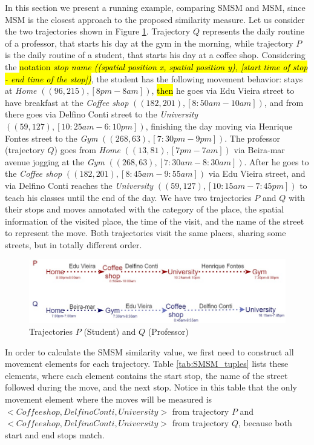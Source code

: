 \documentclass[12pt]{article}
\begin{document}
In this section we present a running example, comparing SMSM and MSM, since MSM is the closest approach to the proposed similarity measure.
Let us consider the two trajectories shown in Figure \ref{fig:bus}. Trajectory $Q$ represents the daily routine of a professor, that starts his day at the gym in the morning, while trajectory $P$ is the daily routine of a student, that starts his day at a coffee shop. Considering the \hl{notation \textit{stop name ((spatial position x, spatial position y), [start time of stop - end time of the stop])}}, the student has the following movement behavior: stays at \textit{Home} $((96,215), [8pm-8am])$, \hl{then} he goes via Edu Vieira street to have breakfast at the \textit{Coffee shop} $((182,201), [8:50am-10am])$, and from there goes via Delfino Conti street to the \textit{University} $((59,127), [10:25am-6:10pm])$, finishing the day moving via Henrique Fontes street to the \textit{Gym} $((268,63), [7:30pm-9pm])$. The professor (trajectory $Q$) goes from \textit{Home} $((13,81), [7pm-7am])$ via Beira-mar avenue jogging at the \textit{Gym} $((268,63), [7:30am-8:30am])$. After he goes to the \textit{Coffee shop} $((182,201), [8:45am-9:55am])$ via Edu Vieira street, and via Delfino Conti reaches the \textit{University} $((59,127), [10:15am-7:45pm])$ to teach his classes until the end of the day. We have two trajectories $P$ and $Q$ with their stops and moves annotated with the category of the place, the spatial information of the visited place, the time of the visit, and the name of the street to represent the move. Both trajectories visit the same places, sharing some streets, but in totally different order.
\begin{figure}[h!]
\centering
\includegraphics[width=1\textwidth]{Images/running_example.jpg}
\caption{\label{fig:bus} Trajectories $P$ (Student) and $Q$ (Professor)}
\end{figure}


In order to calculate the SMSM similarity value, we first need to construct all movement elements for each trajectory. Table \ref{tab:SMSM_tuples} lists these elements, where each element contains the start stop, the name of the street followed during the move, and the next stop. Notice in this table that the only movement element where the moves will be measured is $<Coffee shop, Delfino Conti, University>$ from trajectory $P$ and $<Coffee shop, Delfino Conti, University>$ from trajectory $Q$, because both start and end stops match.
\end{document}
